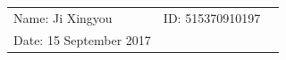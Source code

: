 \documentclass{article}
\begin{document}
\vspace*{0.25cm}

\hrulefill

\thispagestyle{empty}

\begin{center}
\begin{large}
\end{large}

\hrulefill

\vspace*{5cm}
\begin{Large}
\end{Large}

\vspace{2em}

\begin{large}
\end{large}
\end{center}


\vfill

\begin{table}[h!]
\flushleft
\begin{tabular}{lll}
Name: Ji Xingyou \hspace*{2em}&
ID: 515370910197\hspace*{2em}
\\

Date: 15 September 2017

\end{tabular}
\end{table}

\hfill
\begin{tiny}
[rev. 2.0]
\end{tiny}
\newpage
\end{document}
